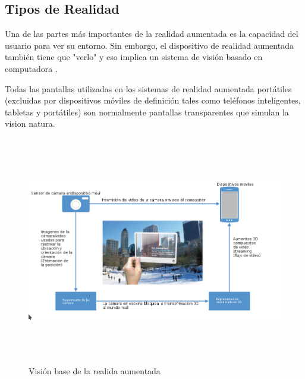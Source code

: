 \subsection{Tipos de Realidad}
Una de las partes más importantes de la realidad aumentada es la capacidad del usuario para ver su entorno. Sin embargo, el dispositivo de realidad aumentada también tiene que "verlo" y eso implica un sistema de visión basado en computadora \cite{B22} .\par
\vspace{5mm}
 Todas las pantallas utilizadas en los sistemas de realidad aumentada portátiles (excluidas por dispositivos móviles de definición tales como teléfonos inteligentes, tabletas y portátiles) son normalmente pantallas transparentes que simulan la vision natura. \par
\vspace{5mm}
\begin{figure}[h!]
	\centering
	\includegraphics[width=17cm,height=10cm]{imagenes/marcoteorico/ar/visionAR.png}
	\caption{Visión base de la realida aumentada\cite{B22}}
	\label{fig:analogo}
\end{figure}
